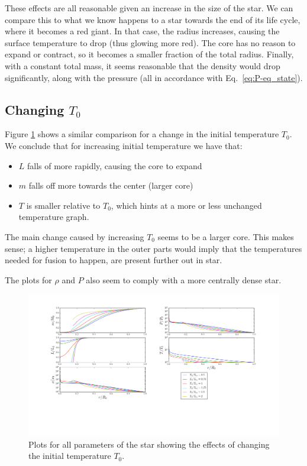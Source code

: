 \documentclass[11pt,twocolumn]{article}
\begin{document}
These effects are all reasonable given an increase in the size of the
star. We can compare this to what we know happens to a star towards the
end of its life cycle, where it becomes a red giant. In that case, the
radius increases, causing the surface temperature to drop (thus
glowing more red). The core has no reason to expand or contract, so it
becomes a smaller fraction of the total radius. Finally, with a constant total mass, it seems reasonable
that the density would drop significantly, along with the pressure
(all in accordance with Eq.~\eqref{eq:P-eq_state}). 


\subsection{Changing $T_0$}
Figure \ref{fig:T-variation} shows a similar comparison for a change
in the initial temperature $T_0$. We conclude that for increasing
initial temperature we have that:

\begin{itemize}
  \item $L$ falls of more rapidly, causing the core to expand
  \item $m$ falls off more towards the center (larger core)
  \item $T$ is smaller relative to $T_0$, which hints at a more or
    less unchanged temperature graph.
\end{itemize}

The main change caused by increasing $T_0$ seems to be a larger
core. This makes sense; a higher temperature in the outer parts would
imply that the temperatures needed for fusion to happen, are present
further out in star.

The plots for $\rho$ and $P$ also seem to comply with a more centrally
dense star.

\begin{figure}[ht]
  \centering
  \includegraphics[width=\linewidth]{fig/T_variation.png}
  \caption{\label{fig:T-variation} Plots for all parameters of the star
  showing the effects of changing the initial temperature $T_0$.}
\end{figure}
\end{document}
